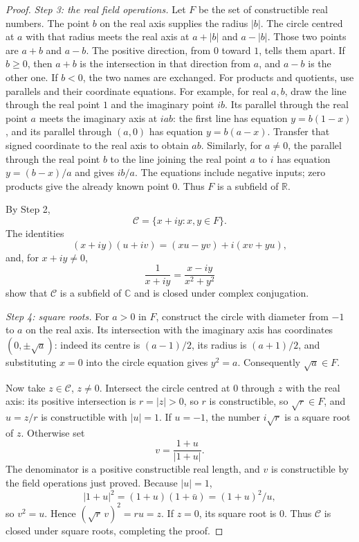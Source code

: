 \begin{proof}
\emph{Step 3: the real field operations.}
Let $F$ be the set of constructible
real numbers. The point $b$ on the real axis supplies the radius $|b|$. The circle centred at $a$ with that radius meets the real axis at $a+|b|$ and $a-|b|$. Those two points are $a+b$ and $a-b$. The positive direction, from $0$ toward $1$, tells them apart. If $b\ge0$, then $a+b$ is the intersection in that direction from $a$, and $a-b$ is the other one. If $b<0$, the two names are exchanged.
For products and quotients, use
parallels and their coordinate equations.
For example, for real $a,b$, draw
the line through the real point $1$
and the imaginary point $ib$.
Its parallel through the real point
$a$ meets the imaginary axis at
$iab$: the first line has equation $y=b(1-x)$,
and its parallel through $(a,0)$ has equation $y=b(a-x)$.
Transfer that signed coordinate to the real axis to obtain $ab$.
Similarly, for $a\ne0$,
the parallel through the real point
$b$ to the line joining the real
point $a$ to $i$ has equation $y=(b-x)/a$ and gives $ib/a$.
The equations include negative inputs; zero products give the already
known point $0$.
Thus $F$ is a subfield of $\mathbb R$.

By Step 2,
\[
\mathcal C=\{x+iy:x,y\in F\}.
\]
The identities
\[
(x+iy)(u+iv)=(xu-yv)+i(xv+yu),
\]
and, for $x+iy\ne0$,
\[
\frac1{x+iy}=\frac{x-iy}{x^2+y^2}
\]
show that $\mathcal C$ is a subfield
of $\mathbb C$ and is closed under
complex conjugation.

\emph{Step 4: square roots.}
For $a>0$ in $F$, construct the
circle with diameter from $-1$ to $a$
on the real axis. Its intersection
with the imaginary axis has
coordinates $(0,\pm\sqrt a)$:
indeed its centre is $(a-1)/2$,
its radius is $(a+1)/2$, and
substituting $x=0$ into the circle
equation gives $y^2=a$.
Consequently $\sqrt a\in F$.

Now take $z\in\mathcal C$, $z\ne0$.
Intersect the circle centred at $0$ through $z$ with the real axis:
its positive intersection is $r=|z|>0$, so $r$ is constructible,
so $\sqrt r\in F$, and
$u=z/r$ is constructible with $|u|=1$.
If $u=-1$, the number $i\sqrt r$
is a square root of $z$.
Otherwise set
\[
v=\frac{1+u}{|1+u|}.
\]
The denominator is a positive constructible
real length, and $v$ is constructible
by the field operations just proved.
Because $|u|=1$,
\[
|1+u|^2=(1+u)(1+\bar u)
=(1+u)^2/u,
\]
so $v^2=u$. Hence
$(\sqrt r\,v)^2=ru=z$.
If $z=0$, its square root is $0$.
Thus $\mathcal C$ is closed under
square roots, completing the proof.
\end{proof}

